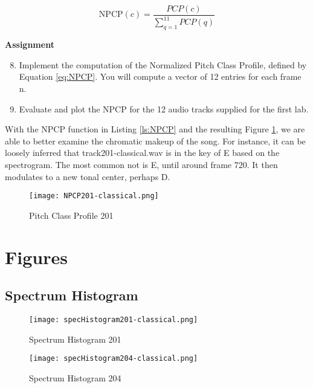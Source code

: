 \documentclass{article} %
\begin{document}
\begin{equation}
\label{eq:NPCP}
\text{NPCP}(c)=\frac{PCP(c)}{\sum\limits_{q=1}^{11}PCP(q)}
\end{equation}


\begin{framed}
\textbf{Assignment}
\begin{enumerate}
\setcounter{enumi}{7}
\item Implement the computation of the Normalized Pitch Class Profile, defined by Equation \ref{eq:NPCP}. You will compute a vector of 12 entries for each frame n.
\item Evaluate and plot the NPCP for the 12 audio tracks supplied for the first lab. 
\end{enumerate}
\end{framed}

With the NPCP function in Listing \ref{ls:NPCP} and the resulting Figure \ref{fig:NPCP201}, we are able to better examine the chromatic makeup of the song. 
For instance, it can be loosely inferred that track201-classical.wav is in the key of E based on the spectrogram. The most common not is E, until around frame 720.
It then modulates to a new tonal center, perhaps D. 
 

\begin{figure}[H]
\centering
\texttt{[image: NPCP201-classical.png]}
\caption{Pitch Class Profile 201}
\label{fig:NPCP201}
\end{figure}

\clearpage
\appendix
\section{Figures}
\subsection{Spectrum Histogram}
\label{sec:specHis}

\begin{figure}[H]
\centering
\texttt{[image: specHistogram201-classical.png]}
\caption{Spectrum Histogram 201}
\label{fig:hist201}
\end{figure}

\begin{figure}[H]
\centering
\texttt{[image: specHistogram204-classical.png]}
\caption{Spectrum Histogram 204}
\label{fig:hist204}
\end{figure}
\end{document}
